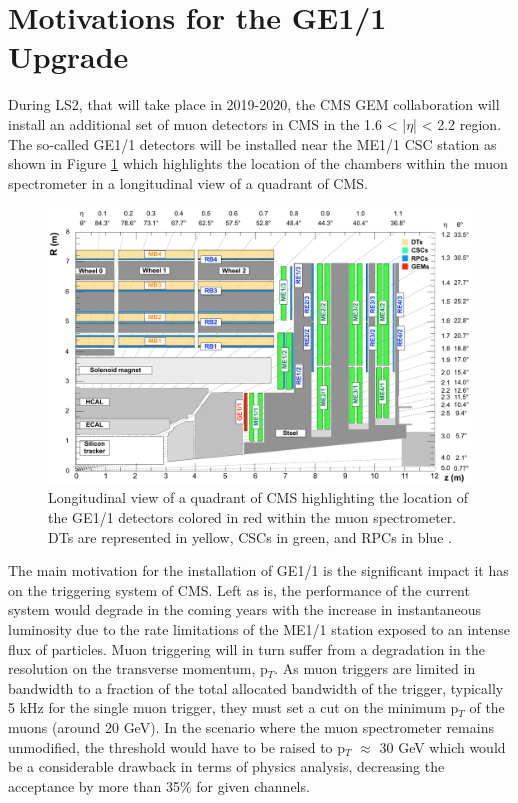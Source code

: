   \section{Motivations for the GE1/1 Upgrade}

    During LS2, that will take place in 2019-2020, the CMS GEM collaboration \cite{Colaleo:2021453} will install an additional set of muon detectors in CMS in the 1.6 < |$\eta$| < 2.2 region. The so-called GE1/1 detectors will be installed near the ME1/1 CSC station as shown in Figure \ref{fig:II-1-ge11} which highlights the location of the chambers within the muon spectrometer in a longitudinal view of a quadrant of CMS. \\

    \begin{figure}[t!]
      \centering
      \includegraphics[width=\textwidth]{img/II-1-gem/ge11-quadrant.pdf}
      \caption{Longitudinal view of a quadrant of CMS highlighting the location of the GE1/1 detectors colored in red within the muon spectrometer. DTs are represented in yellow, CSCs in green, and RPCs in blue \cite{Colaleo:2021453}.}
      \label{fig:II-1-ge11}
    \end{figure}

    The main motivation for the installation of GE1/1 is the significant impact it has on the triggering system of CMS. Left as is, the performance of the current system would degrade in the coming years with the increase in instantaneous luminosity due to the rate limitations of the ME1/1 station exposed to an intense flux of particles. Muon triggering will in turn suffer from a degradation in the resolution on the transverse momentum, p$_T$. As muon triggers are limited in bandwidth to a fraction of the total allocated bandwidth of the trigger, typically 5 kHz for the single muon trigger, they must set a cut on the minimum p$_T$ of the muons (around 20 GeV). In the scenario where the muon spectrometer remains unmodified, the threshold would have to be raised to p$_T$ $ \approx $ 30 GeV which would be a considerable drawback in terms of physics analysis, decreasing the acceptance by more than 35\% for given channels. \\

